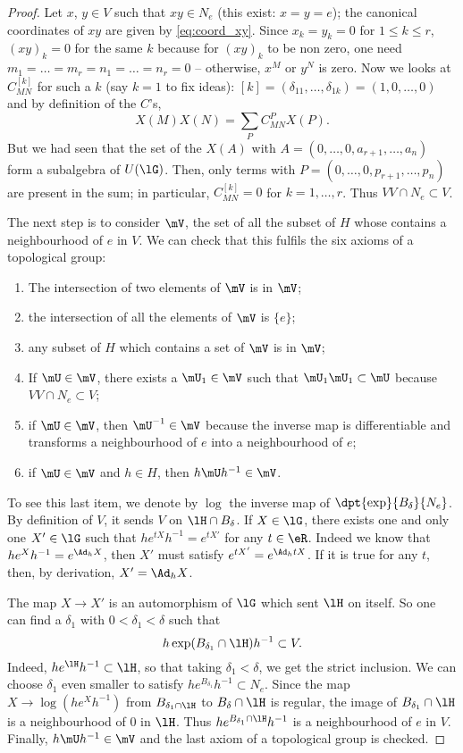 \begin{proof}
Let $x$, $y\in V$ such that $xy\in N_e$ (this exist: $x=y=e$); the canonical coordinates of $xy$ are given by \eqref{eq:coord_xy}. Since $x_k=y_k=0$ for $1\leq k\leq r$, $(xy)_k=0$ for the same $k$ because for $(xy)_k$ to be non zero, one need $m_1=\ldots=m_r=n_1=\ldots=n_r=0$ -- otherwise, $x^M$ or $y^N$ is zero. Now we looks at $C^{[k]}_{MN}$ for such a $k$ (say $k=1$ to fix ideas): $[k]=(\delta_{11},\ldots,\delta_{1k})=(1,0,\ldots,0)$ and by definition of the $C$'s,
\[
   X(M)X(N)=\sum_PC_{MN}^PX(P).
\]
But we had seen that the set of the $X(A)$ with $A=(0,\ldots,0,a_{r+1},\ldots,a_n)$ form a subalgebra of $U(\lG)$. Then, only terms with $P=(0,\ldots,0,p_{r+1},\ldots,p_n)$ are present in the sum; in particular, $C_{MN}^{[k]}=0$ for $k=1,\ldots,r$. Thus $VV\cap N_e\subset V$.

The next step is to consider $\mV$, the set of all the subset of $H$ whose contains a neighbourhood of $e$ in $V$. We can check that this fulfils the six axioms of a topological group:

\begin{enumerate}
\item The intersection of two elements of $\mV$ is in $\mV$;
\item the intersection of all the elements of $\mV$ is $\{e\}$;
\item any subset of $H$ which contains a set of $\mV$ is in $\mV$;
\item If $\mU\in\mV$, there exists a $\mU_1\in\mV$ such that $\mU_1\mU_1\subset\mU$ because $VV\cap N_e\subset V$;
\item if $\mU\in\mV$, then $\mU^{-1}\in\mV$ because the inverse map is differentiable and transforms a neighbourhood of $e$ into a neighbourhood of $e$;
\item if $\mU\in\mV$ and $h\in H$, then $h\mU h^{-1}\in\mV$.
\end{enumerate}

To see this last item, we denote by $\log$ the inverse map of $\dpt{\exp}{B_{\delta}}{N_e}$. By definition of $V$, it sends $V$ on $\lH\cap B_{\delta}$. If $X\in\lG$, there exists one and only one $X'\in\lG$ such that $he^{tX}h^{-1}=e^{tX'}$ for any $t\in\eR$. Indeed we know that $he^{X}h^{-1}=e^{\Ad_hX}$, then $X'$ must satisfy $e^{tX'}=e^{\Ad_htX}$. If it is true for any $t$, then, by derivation, $X'=\Ad_hX$.

The map $X\to X'$ is an automorphism of $\lG$ which sent $\lH$ on itself. So one can find a $\delta_1$ with $0<\delta_1<\delta$ such that
\[
   h\exp({B_{\delta_1}\cap\lH})h^{-1}\subset V.
\]
Indeed, $he^{\lH} h^{-1}\subset\lH$, so that taking $\delta_1<\delta$, we get the strict inclusion. We can choose $\delta_1$ even smaller to satisfy $he^{B_{\delta_1}}h^{-1}\subset N_e$. Since the map $X\to\log(he^{X}h^{-1})$ from $B_{\delta_1\cap\lH}$ to $B_{\delta}\cap\lH$ is regular, the image of $B_{\delta_1}\cap\lH$ is a neighbourhood of $0$ in $\lH$. Thus $he^{B_{\delta_1}\cap\lH}h^{-1}$ is a neighbourhood of $e$ in $V$. Finally, $h\mU h^{-1}\in\mV$ and the last axiom of a topological group is checked.


\end{proof}
